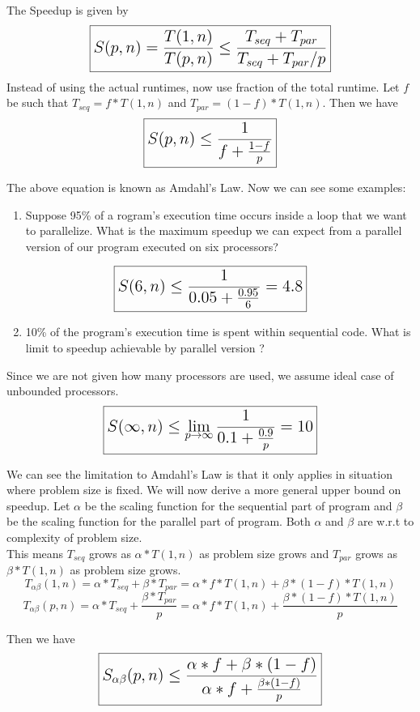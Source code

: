 \documentclass{article}
\begin{document}
The Speedup is given by \[\Large \boxed{S(p,n) = \frac{T(1,n)}{T(p,n)} \leq \frac{T_{seq} + T_{par}}{T_{seq} + T_{par} / p}}\] 
Instead of using the actual runtimes, now use fraction of the total runtime. Let $f$ be such that $T_{seq} = f * T(1,n)$ and $T_{par} = (1-f) * T(1,n)$. Then we have \[\Large \boxed{S(p,n) \leq \frac{1}{f + \frac{1-f}{p}}}\]

The above equation is known as Amdahl's Law. Now we can see some examples: \\
\begin{enumerate}
    
    \item Suppose 95\% of a rogram’s execution time occurs inside a loop that we want to parallelize. What is the maximum speedup we can expect from a parallel version of our program executed on six processors?
\end{enumerate}

\[\Large \boxed{S(6,n) \leq \frac{1}{0.05 + \frac{0.95}{6}} = 4.8} \]

\begin{enumerate}
    \setcounter{enumi}{1}
    \item 10\% of the program's execution time is spent within sequential code. What is limit to speedup achievable by parallel version ?
\end{enumerate}

Since we are not given how many processors are used, we assume ideal case of unbounded processors.
\[\Large \boxed{ S(\infty,n) \leq \lim_{p \to \infty} \frac{1}{0.1 + \frac{0.9}{p}} = 10} \]

We can see the limitation to Amdahl's Law is that it only applies in situation where problem size is fixed. We will now derive a more general upper bound on speedup. Let $\alpha$ be the scaling function for the sequential part of program and $\beta$ be the scaling function for the parallel part of program. Both $\alpha$ and $\beta$ are w.r.t to complexity of problem size. \\
This means $T_{seq}$ grows as $\alpha * T(1,n)$ as problem size grows and $T_{par}$ grows as $\beta * T(1,n)$ as problem size grows. \\

\[ T_{\alpha \beta} (1,n) = \alpha * T_{seq} + \beta * T_{par} = \alpha * f * T(1,n) + \beta * (1-f) * T(1,n) \]
\[ T_{\alpha \beta} (p,n) = \alpha * T_{seq} + \frac{\beta * T_{par}}{p} = \alpha * f * T(1,n) + \frac{\beta * (1-f) * T(1,n)}{p} \]

Then we have \[\Large \boxed{S_{\alpha \beta}(p,n) \leq \frac{\alpha * f + \beta * (1-f)}{\alpha * f + \frac{\beta * (1-f)}{p}}}\]
\end{document}
